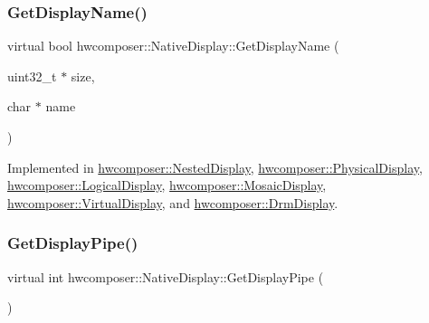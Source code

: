 \mbox{\label{classhwcomposer_1_1NativeDisplay_a28c095d6d08c84e40b5d5160d038f0b5}} 
\subsubsection{\texorpdfstring{Get\+Display\+Name()}{GetDisplayName()}}
{\footnotesize\ttfamily virtual bool hwcomposer\+::\+Native\+Display\+::\+Get\+Display\+Name (\begin{DoxyParamCaption}\item[{uint32\+\_\+t $\ast$}]{size,  }\item[{char $\ast$}]{name }\end{DoxyParamCaption})\hspace{0.3cm}{\ttfamily [pure virtual]}}



Implemented in \mbox{\hyperlink{classhwcomposer_1_1NestedDisplay_a0a1ca305ffa0ace0c2bd5ff601db9b18}{hwcomposer\+::\+Nested\+Display}}, \mbox{\hyperlink{classhwcomposer_1_1PhysicalDisplay_a1d0fe5aac11bc35aa95a55289993d9a8}{hwcomposer\+::\+Physical\+Display}}, \mbox{\hyperlink{classhwcomposer_1_1LogicalDisplay_a93e917448b225c7342d34ef589090987}{hwcomposer\+::\+Logical\+Display}}, \mbox{\hyperlink{classhwcomposer_1_1MosaicDisplay_ac76216611bf8bebcf182a1c18b3d0c04}{hwcomposer\+::\+Mosaic\+Display}}, \mbox{\hyperlink{classhwcomposer_1_1VirtualDisplay_a3f83c9978807be3b71c095f12d22359c}{hwcomposer\+::\+Virtual\+Display}}, and \mbox{\hyperlink{classhwcomposer_1_1DrmDisplay_ac1feeb5b5c7b1f9dbb0faf1a2bd8befe}{hwcomposer\+::\+Drm\+Display}}.

\mbox{\label{classhwcomposer_1_1NativeDisplay_aaf80095ae6aed35c64dd633a6a2f101a}} 
\subsubsection{\texorpdfstring{Get\+Display\+Pipe()}{GetDisplayPipe()}}
{\footnotesize\ttfamily virtual int hwcomposer\+::\+Native\+Display\+::\+Get\+Display\+Pipe (\begin{DoxyParamCaption}{ }\end{DoxyParamCaption})\hspace{0.3cm}{\ttfamily [pure virtual]}}

